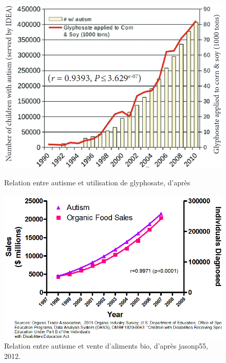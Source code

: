 \begin{figure}[H]
	\begin{minipage}[b]{.46\linewidth}
		\centering
		\includegraphics[width=\linewidth]{img/autisme_glyphosate.png}
		\caption[Relation entre autisme et utilisation de glyphosate.]{Relation entre autisme et utilisation de glyphosate, d'après \cite[Figure 2, p. 51]{shaw_elevated_2017} \label{fig:autisme-glyphosate}}
	\end{minipage} \hfill
	\begin{minipage}[b]{.46\linewidth}
		\centering
		\includegraphics[width=\linewidth]{img/autisme_bio.png}
		\caption[Relation entre autisme et vente d'aliments \og bio\fg{}.]{Relation entre autisme et vente d'aliments \og bio\fg{}, d'après \og jasonp55\fg{}, 2012.}
		\label{fig:autisme-bio}
	\end{minipage}
\end{figure}

